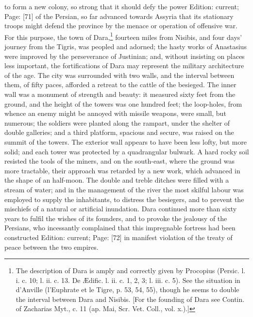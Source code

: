 to form a new colony, so strong that it should defy the power Edition: current; Page: [71] of the Persian, so far advanced towards Assyria that its stationary troops might defend the province by the menace or operation of offensive war. For this purpose, the town of Dara,\footnote{The description of Dara is amply and correctly given by Procopius (Persic. l. i. c. 10; l. ii. c. 13. De Ædific. l. ii. c. 1, 2, 3; l. iii. c. 5). See the situation in d\texthebrew{}’Anville (l\texthebrew{}’Euphrate et le Tigre, p. 53, 54, 55), though he seems to double the interval between Dara and Nisibis. [For the founding of Dara see Contin. of Zacharias Myt., c. 11 (ap. Mai, Scr. Vet. Coll., vol. x.).]} fourteen miles from Nisibis, and four days\texthebrew{}’ journey from the Tigris, was peopled and adorned; the hasty works of Anastasius were improved by the perseverance of Justinian; and, without insisting on places less important, the fortifications of Dara may represent the military architecture of the age. The city was surrounded with two walls, and the interval between them, of fifty paces, afforded a retreat to the cattle of the besieged. The inner wall was a monument of strength and beauty: it measured sixty feet from the ground, and the height of the towers was one hundred feet; the loop-holes, from whence an enemy might be annoyed with missile weapons, were small, but numerous; the soldiers were planted along the rampart, under the shelter of double galleries; and a third platform, spacious and secure, was raised on the summit of the towers. The exterior wall appears to have been less lofty, but more solid; and each tower was protected by a quadrangular bulwark. A hard rocky soil resisted the tools of the miners, and on the south-east, where the ground was more tractable, their approach was retarded by a new work, which advanced in the shape of an half-moon. The double and treble ditches were filled with a stream of water; and in the management of the river the most skilful labour was employed to supply the inhabitants, to distress the besiegers, and to prevent the mischiefs of a natural or artificial inundation. Dara continued more than sixty years to fulfil the wishes of its founders, and to provoke the jealousy of the Persians, who incessantly complained that this impregnable fortress had been constructed Edition: current; Page: [72] in manifest violation of the treaty of peace between the two empires.

